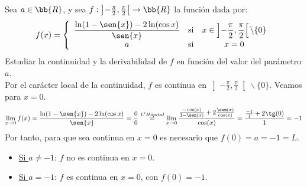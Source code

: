 \begin{ejercicio}
    Sea $a\in \bb{R}$, y sea $f:\left]-\frac{\pi}{2},\frac{\pi}{2} \right[   \to \bb{R}$ la función dada por:
    $$f(x)=\left\{
    \begin{array}{ccc}
    \displaystyle \frac{\ln(1-\sen{x}) -2\ln(\cos{x})}{\sen{x}} & \text{si} & x\in \displaystyle \left]-\frac{\pi}{2},\frac{\pi}{2} \right[ \backslash \{0\} \\
    a & \text{si} & x=0
    \end{array}\right.$$
    Estudiar la continuidad y la derivabilidad de $f$ en función del valor del parámetro $a$.\\

    Por el carácter local de la continuidad, $f$ es continua en $\displaystyle \left]-\frac{\pi}{2},\frac{\pi}{2} \right[ \backslash \{0\}$. Veamos para $x=0$.
    \begin{equation*}
        \lim_{x\to0}f(x) = \frac{\ln(1-\sen{x}) -2\ln(\cos{x})}{\sen{x}} = \frac{0}{0} \stackrel{L'H\hat{o}pital}{=}
        \lim_{x\to0} \frac{\frac{-\cos(x)}{1-\sen(x)} +2\frac{\sen(x)}{\cos(x)}}{\cos(x)} = \frac{\frac{-1}{1} + 2\tg(0)}{1} = -1
    \end{equation*}
    Por tanto, para que sea continua en $x=0$ es necesario que $f(0)=a=-1 =L$.
    \begin{itemize}
        \item \underline{Si $a\neq -1$}: $f$ no es continua en $x=0$.
        \item \underline{Si $a=-1$}: $f$ es continua en $x=0$, con $f(0)=-1$.
    \end{itemize}


\end{ejercicio}
